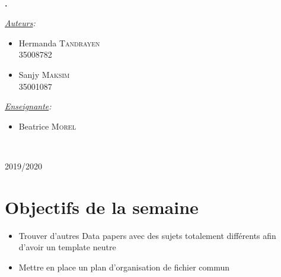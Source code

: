 \documentclass[11pt,oneside]{article}
\begin{document}
\begin{titlepage}
\phantom{aaaaaaaaaaaaaaaaaaaaaaaaaaaaaaaaaaaaaaa
ytrfdytfugvghikuhjbiujbhaaaaaaaaaaaaaaa}
\center
\fbox{\begin{minipage}[t][1cm][c]{8cm}
\begin{center}
{\huge \bfseries \textcolor{Rapport}{Feuille de Route}}
\end{center}
\end{minipage}}\\[0.5cm]
\textbf{\Large \color{Mulberry} .}\\[0.5cm] 
\begin{minipage}{0.5\textwidth}
\begin{flushleft} \large
\hspace{0.22\textwidth}\emph{\underline{Auteurs}:}\\
\begin{multicols}{2}
\begin{itemize}[font=\color{airforceblue} \Large, label=, leftmargin=0cm]
\item{Hermanda \textsc{Tandrayen} \\ {\small{35008782}}}
\item{Sanjy \textsc{Maksim} \\ {\small{35001087}}}
\end{itemize}
\end{multicols}
\end{flushleft}
\end{minipage}
\begin{minipage}{0.45\textwidth}
\begin{flushright} \large
\emph{\underline{Enseignante}:}\phantom{aaaaa}\\
\begin{itemize}[font=\color{amber} \Large, label=, leftmargin=3.5cm]
\item{Beatrice \textsc{Morel}}
\end{itemize}
\end{flushright}
\end{minipage}\\[0cm]
\vspace{10cm} 
\begin{center}
2019/2020
\end{center}
\vfill
\end{titlepage}


\newpage
\part*{Objectifs de la semaine}
\begin{itemize}
	\item Trouver d'autres Data papers avec des sujets totalement différents afin d'avoir un template neutre
	\item Mettre en place un plan d'organisation de fichier commun
\end{itemize}
\end{document}
